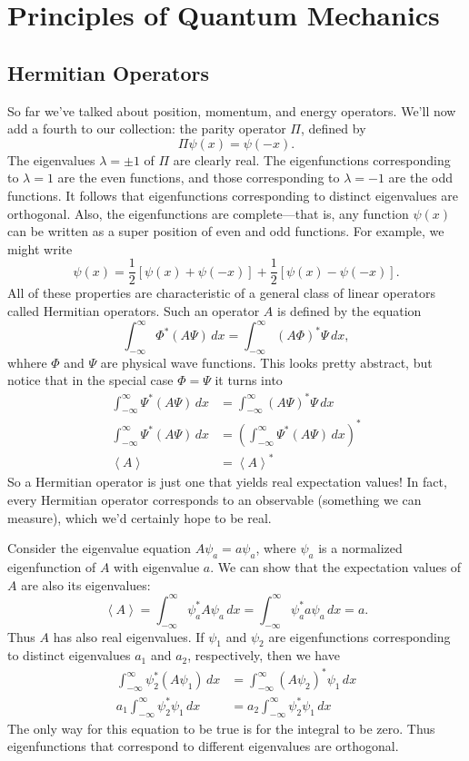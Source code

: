\documentclass[../p052main.tex]{subfiles}
\begin{document}
\chapter{Principles of Quantum Mechanics}
\section{Hermitian Operators}
So far we've talked about position, momentum, and energy operators.
We'll now add a fourth to our collection: the parity operator $\Pi$, defined by
\[ \Pi \psi(x) = \psi(-x). \]
The eigenvalues $\lambda = \pm 1$ of $\Pi$ are clearly real.
The eigenfunctions corresponding to $\lambda = 1$ are the even functions, and those corresponding to $\lambda = -1$ are the odd functions.
It follows that eigenfunctions corresponding to distinct eigenvalues are orthogonal.
Also, the eigenfunctions are complete---that is, any function $\psi(x)$ can be written as a super position of even and odd functions.
For example, we might write
\[ \psi (x) = \frac{1}{2} \left[ \psi(x) + \psi(-x) \right] + \frac{1}{2} \left[ \psi(x) - \psi(-x) \right]. \]
All of these properties are characteristic of a general class of linear operators called Hermitian operators.
Such an operator $A$ is defined by the equation
\[ \int_{-\infty}^{\infty} \Phi^* \left( A \Psi \right) \,dx = \int_{-\infty}^{\infty} \left( A \Phi \right)^* \Psi \,dx, \]
whhere $\Phi$ and $\Psi$ are physical wave functions.
This looks pretty abstract, but notice that in the special case $\Phi = \Psi$ it turns into
\begin{align*}
    \int_{-\infty}^{\infty} \Psi^* \left( A \Psi \right) \,dx &= \int_{-\infty}^{\infty} \left( A \Psi \right)^* \Psi \,dx \\
    \int_{-\infty}^{\infty} \Psi^* \left( A \Psi \right) \,dx &= \left( \int_{-\infty}^{\infty} \Psi^* \left( A \Psi \right) \,dx \right)^* \\
    \left< A \right> &= \left< A \right>^*
\end{align*}
So a Hermitian operator is just one that yields real expectation values!
In fact, every Hermitian operator corresponds to an observable (something we can measure), which we'd certainly hope to be real.

Consider the eigenvalue equation $A \psi_a = a \psi_a$, where $\psi_a$ is a normalized eigenfunction of $A$ with eigenvalue $a$.
We can show that the expectation values of $A$ are also its eigenvalues:
\[ \left< A \right> = \int_{-\infty}^{\infty} \psi_a^* A \psi_a \,dx = \int_{-\infty}^{\infty} \psi_a^* a \psi_a \,dx = a. \]
Thus $A$ has also real eigenvalues.
If $\psi_1$ and $\psi_2$ are eigenfunctions corresponding to distinct eigenvalues $a_1$ and $a_2$, respectively, then we have
\begin{align*}
    \int_{-\infty}^{\infty} \psi_2^* (A \psi_1) \,dx &= \int_{-\infty}^{\infty} (A \psi_2)^* \psi_1 \,dx \\
    a_1 \int_{-\infty}^{\infty} \psi_2^* \psi_1 \,dx &= a_2 \int_{-\infty}^{\infty} \psi_2^* \psi_1 \,dx
\end{align*}
The only way for this equation to be true is for the integral to be zero.
Thus eigenfunctions that correspond to different eigenvalues are orthogonal.
\end{document}
